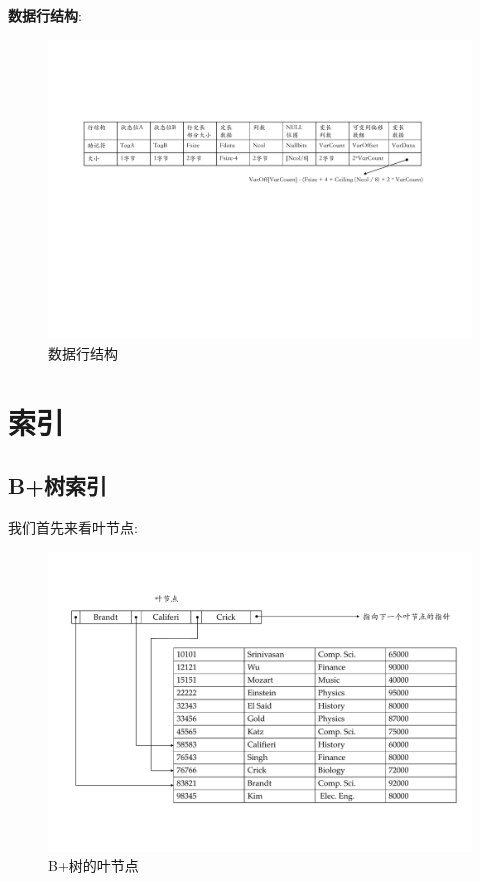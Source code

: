 \textbf{数据行结构}:
\begin{figure}[H]
    \centering
    \includegraphics[width=1.1\textwidth]{figure/数据行结构.pdf}
    \caption{数据行结构}
\end{figure}

\section{索引}

\subsection{B+树索引}

我们首先来看叶节点:
\begin{figure}[H]
    \centering
    \includegraphics[width=.8\textwidth]{figure/B+叶节点.pdf}
    \caption{B+树的叶节点}
\end{figure}


